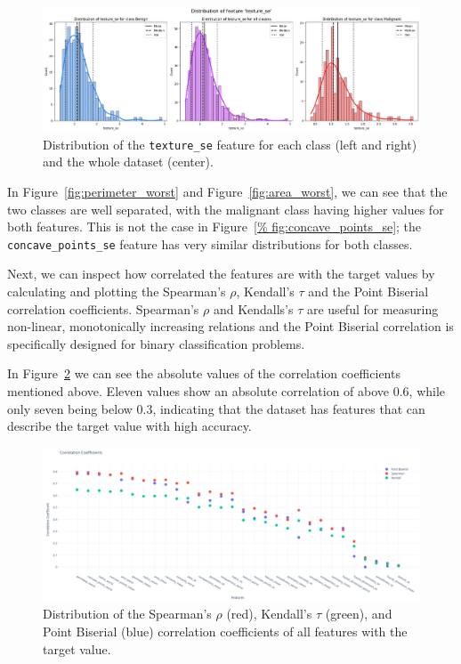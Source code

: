 \documentclass[12pt]{article}
\begin{document}
\begin{figure}[H]
    \centering
    \includegraphics[width=\textwidth]{ims/texture_se.png}
    \caption{Distribution of the \texttt{texture\_se} feature for each class
    (left and right) and the whole dataset (center).}
    \label{fig:concave_points_se}
\end{figure}

In Figure~\ref{fig:perimeter_worst} and Figure~\ref{fig:area_worst}, we can see
that the two classes are well separated, with the malignant class having higher
values for both features. This is not the case in Figure~\ref{%
fig:concave_points_se}; the \texttt{concave\_points\_se} feature has very
similar distributions for both classes.

Next, we can inspect how correlated the features are with the target values by
calculating and plotting the Spearman's $\rho$, Kendall's $\tau$ and the Point
Biserial correlation coefficients. Spearman's $\rho$ and Kendalls's $\tau$ are
useful for measuring non-linear, monotonically increasing relations and the
Point Biserial correlation is specifically designed for binary classification
problems.

In Figure~\ref{fig:corr_coeffs} we can see the absolute values of the
correlation coefficients mentioned above. Eleven values show an absolute
correlation of above 0.6, while only seven being below 0.3, indicating that
the dataset has features that can describe the target value with high accuracy.

\begin{figure}[H]
    \centering
    \includegraphics[width=\textwidth]{ims/corr_coeffs.png}
    \caption{Distribution of the Spearman's $\rho$ (red), Kendall's $\tau$
    (green), and Point Biserial (blue) correlation coefficients of all features
    with the target value.}
    \label{fig:corr_coeffs}
\end{figure}
\end{document}
